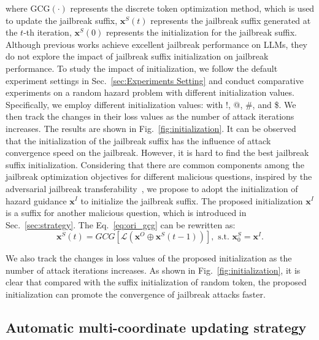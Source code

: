 
where $\text{GCG}(\cdot)$ represents the discrete token optimization method, which is used to update the jailbreak suffix, $\boldsymbol{x}^{S}(t)$ represents the jailbreak suffix generated at the $t$-th iteration, $\boldsymbol{x}^{S}(0)$ represents the initialization for the jailbreak suffix. Although previous works achieve excellent jailbreak performance on LLMs, they do not explore the impact of jailbreak suffix initialization on jailbreak performance. To study the impact of initialization, we follow the default experiment settings in Sec.~\ref{sec:Experiments Setting} and conduct comparative experiments on a random hazard problem with different initialization values. Specifically, we employ different initialization values: with !, @, \#, and \$. We then track the changes in their loss values as the number of attack iterations increases. The results are shown in Fig.~\ref{fig:initialization}. It can be observed that the initialization of the jailbreak suffix has the influence of attack convergence speed on the jailbreak. However, it is hard to find the best jailbreak suffix initialization. Considering that there are common components among the jailbreak optimization objectives for different malicious questions, inspired by the adversarial jailbreak transferability~\cite{zhou2024easyjailbreak,chu2024comprehensive,xiao2024tastle}, we propose to adopt the initialization of hazard guidance $\boldsymbol{x}^{I}$ to initialize the jailbreak suffix. The proposed initialization $\boldsymbol{x}^{I}$ is a suffix for another malicious question, which is introduced in Sec.~\ref{sec:strategy}. The Eq.~\ref{eq:ori_gcg} can be rewritten as:
\begin{equation}
\label{eq:our_gcg}
\boldsymbol{x}^{S}(t)=GCG\left[\mathcal{L}\left(\boldsymbol{x}^{O} \oplus \boldsymbol{x}^{S}(t-1)\right)\right], \text{ s.t. } \boldsymbol{x}_{0}^{S}=\boldsymbol{x}^{I}. 
\end{equation}


We also track the changes in loss values of the proposed initialization as the number of attack iterations increases. As shown in Fig.~\ref{fig:initialization}, it is clear that compared with the suffix initialization of random token, the proposed initialization can promote the convergence of jailbreak attacks faster.




\subsection{Automatic multi-coordinate updating strategy}
\label{sec:auto_strategy}




